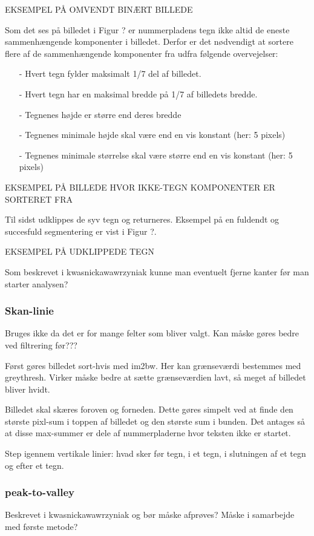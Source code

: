 EKSEMPEL PÅ OMVENDT BINÆRT BILLEDE

Som det ses på billedet i Figur ? er nummerpladens tegn ikke altid de eneste sammenhængende komponenter i billedet. Derfor er det nødvendigt at sortere flere af de sammenhængende komponenter fra udfra følgende overvejelser:

\begin{itemize}
\item[-] Hvert tegn fylder maksimalt 1/7 del af billedet.
\item[-] Hvert tegn har en maksimal bredde på 1/7 af billedets bredde.
\item[-] Tegnenes højde er større end deres bredde
\item[-] Tegnenes minimale højde skal være end en vis konstant (her: 5 pixels)
\item[-] Tegnenes minimale størrelse skal være større end en vis konstant (her: 5 pixels)
\end{itemize}

EKSEMPEL PÅ BILLEDE HVOR IKKE-TEGN KOMPONENTER ER SORTERET FRA

Til sidst udklippes de syv tegn og returneres. Eksempel på en fuldendt og succesfuld segmentering er vist i Figur ?.

EKSEMPEL PÅ UDKLIPPEDE TEGN

Som beskrevet i kwasnickawawrzyniak kunne man eventuelt fjerne kanter før man starter analysen?

\subsubsection{Skan-linie}
Bruges ikke da det er for mange felter som bliver valgt. Kan måske gøres bedre ved filtrering før???

Først gøres billedet sort-hvis med im2bw. Her kan grænseværdi bestemmes med greythresh. Virker måske bedre at sætte grænseværdien lavt, så meget af billedet bliver hvidt.

Billedet skal skæres foroven og forneden. Dette gøres simpelt ved at finde den største pixl-sum i toppen af billedet og den største sum i bunden. Det antages så at disse max-summer er dele af nummerpladerne hvor teksten ikke er startet.

Step igennem vertikale linier: hvad sker før tegn, i et tegn, i slutningen af et tegn og efter et tegn.

\subsubsection{peak-to-valley}

Beskrevet i kwasnickawawrzyniak og bør måske afprøves? Måske i samarbejde med første metode?

